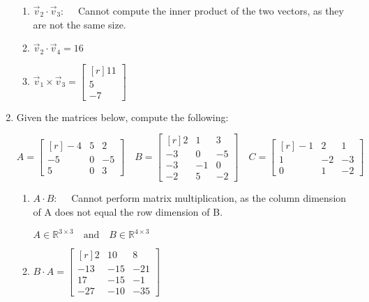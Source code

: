 \documentclass[11pt, oneside, letter]{article}
\begin{document}
\begin{enumerate}
\begin{enumerate}
		\item $\vec{v}_2 \cdot \vec{v}_3: \quad$
		Cannot compute the inner product of the two vectors, as they are not the same size.
		
		\item $\vec{v}_2 \cdot \vec{v}_4 = 16$
		
		\item {$\vec{v}_1 \times \vec{v}_3 = 
		\begin{bmatrix*}[r]
		11 \\ 5 \\ -7
		\end{bmatrix*}$}
		
		\end{enumerate}
	
\vspace{4ex}

	\item Given the matrices below, compute the following:
	
	\begin{center}
	$ A = 
	\begin{bmatrix*}[r]
	-4 & 5 & 2 \\ -5 & 0 & -5 \\ 5 & 0 & 3
	\end{bmatrix*}	
	\quad
	B = 
	\begin{bmatrix*}[r]
	2 & 1 & 3 \\ -3 & 0 & -5 \\ -3 & -1 & 0 \\ -2 & 5 & -2
	\end{bmatrix*}	
	\quad
	C = 
	\begin{bmatrix*}[r]
	-1 & 2 & 1 \\ 1 & -2 & -3 \\ 0 & 1 & -2
	\end{bmatrix*}	
	$	
	\end{center}	
	
		\begin{enumerate}
		\item $A \cdot B: \quad$
			Cannot perform matrix multiplication, as the column dimension of A does not equal the row dimension of B.
			\begin{center}
			$A \in \mathbb{R}^{3 \times 3} \quad \mbox{and} \quad B \in \mathbb{R}^{4 \times 3}$
			\end{center}
			
		\item $B \cdot A = 
			\begin{bmatrix*}[r]
			2 & 10 & 8 \\ -13 & -15 & -21 \\ 17 & -15 & -1 \\ -27 & -10 & -35
			\end{bmatrix*}
			$
			

\end{enumerate}
\end{enumerate}
\end{document}
